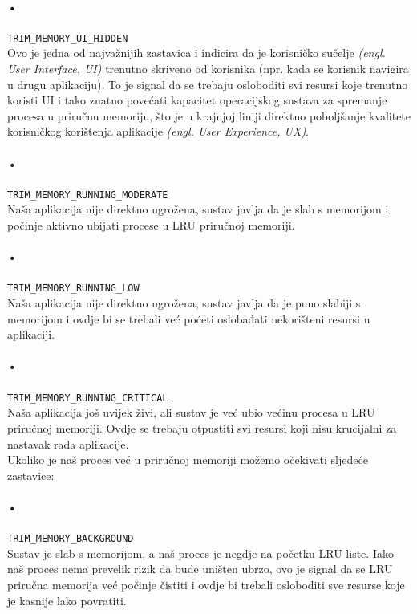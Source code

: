 \documentclass[times, utf8, zavrsni]{fer}
\begin{document}
\paragraph{•}
\verb|TRIM_MEMORY_UI_HIDDEN|\\
Ovo je jedna od najvažnijih zastavica i indicira da je korisničko sučelje \textit{(engl. User Interface, UI)} trenutno skriveno od korisnika (npr. kada se korisnik navigira u drugu aplikaciju). To je signal da se trebaju osloboditi svi resursi koje trenutno koristi UI i tako znatno povećati kapacitet operacijskog sustava za spremanje procesa u priručnu memoriju, što je u krajnjoj liniji direktno poboljšanje kvalitete korisničkog korištenja aplikacije \textit{(engl. User Experience, UX)}.

\paragraph{•}
\verb|TRIM_MEMORY_RUNNING_MODERATE|\\
Naša aplikacija nije direktno ugrožena, sustav javlja da je slab s memorijom i počinje aktivno ubijati procese u LRU priručnoj memoriji.

\paragraph{•}
\verb|TRIM_MEMORY_RUNNING_LOW|\\
Naša aplikacija nije direktno ugrožena, sustav javlja da je puno slabiji s memorijom i ovdje bi se trebali već poćeti oslobađati nekorišteni resursi u aplikaciji.

\paragraph{•}
\verb|TRIM_MEMORY_RUNNING_CRITICAL|\\
Naša aplikacija još uvijek živi, ali sustav je već ubio većinu procesa u LRU priručnoj memoriji. Ovdje se trebaju otpustiti svi resursi koji nisu krucijalni za nastavak rada aplikacije.\\

\noindent
Ukoliko je naš proces već u priručnoj memoriji možemo očekivati sljedeće zastavice:

\paragraph{•}
\verb|TRIM_MEMORY_BACKGROUND|\\
Sustav je slab s memorijom, a naš proces je negdje na početku LRU liste. Iako naš proces nema prevelik rizik da bude uništen ubrzo, ovo je signal da se LRU priručna memorija već počinje čistiti i ovdje bi trebali osloboditi sve resurse koje je kasnije lako povratiti.
\end{document}
